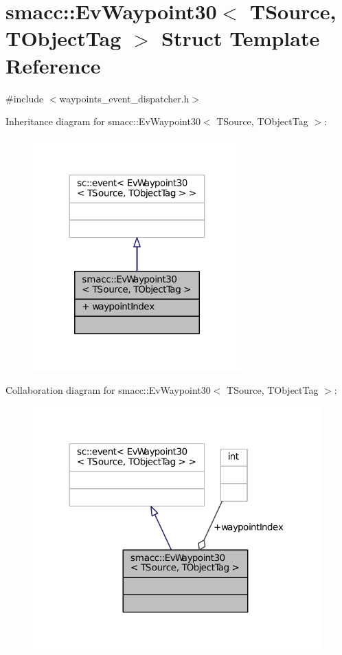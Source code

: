 \hypertarget{structsmacc_1_1EvWaypoint30}{}\section{smacc\+:\+:Ev\+Waypoint30$<$ T\+Source, T\+Object\+Tag $>$ Struct Template Reference}
\label{structsmacc_1_1EvWaypoint30}


{\ttfamily \#include $<$waypoints\+\_\+event\+\_\+dispatcher.\+h$>$}



Inheritance diagram for smacc\+:\+:Ev\+Waypoint30$<$ T\+Source, T\+Object\+Tag $>$\+:
\nopagebreak
\begin{figure}[H]
\begin{center}
\leavevmode
\includegraphics[width=227pt]{structsmacc_1_1EvWaypoint30__inherit__graph}
\end{center}
\end{figure}


Collaboration diagram for smacc\+:\+:Ev\+Waypoint30$<$ T\+Source, T\+Object\+Tag $>$\+:
\nopagebreak
\begin{figure}[H]
\begin{center}
\leavevmode
\includegraphics[width=314pt]{structsmacc_1_1EvWaypoint30__coll__graph}
\end{center}
\end{figure}
